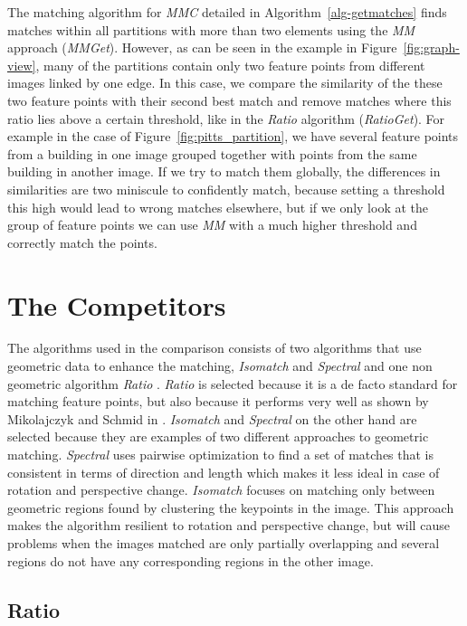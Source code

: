 The matching algorithm for \emph{MMC} detailed in 
Algorithm~\ref{alg-getmatches} finds matches within all partitions with 
more than two elements using the \emph{MM} approach (\emph{MMGet}).  
However, as can be seen in the example in Figure~\ref{fig:graph-view}, 
many of the partitions contain only two feature points from different 
images linked by one edge. In this case, we compare the similarity of 
the these two feature points with their second best match and remove 
matches where this ratio lies above a certain threshold, like in the 
\emph{Ratio} algorithm (\emph{RatioGet}).  For example in the case of 
Figure~\ref{fig:pitts_partition}, we have several feature points from a 
building in one image grouped together with points from the same 
building in another image. If we try to match them globally, the 
differences in similarities are two miniscule to confidently match, 
because setting a threshold this high would lead to wrong matches 
elsewhere, but if we only look at the group of feature points we can use 
\emph{MM} with a much higher threshold and correctly match the points.

\section{The Competitors}

The algorithms used in the comparison consists of two algorithms that 
use geometric data to enhance the matching, \emph{Isomatch} 
\cite{das2008event} and \emph{Spectral} \cite{leordeanu2005spectral} and 
one non geometric algorithm \emph{Ratio} \cite{lowe2004sift}.  
\emph{Ratio} is selected because it is a de facto standard for matching 
feature points, but also because it performs very well as shown by 
Mikolajczyk and Schmid in \cite{mikolajczyk2005performance}.  
\emph{Isomatch} and \emph{Spectral} on the other hand are selected 
because they are examples of two different approaches to geometric 
matching. \emph{Spectral} uses pairwise optimization to find a set of 
matches that is consistent in terms of direction and length which makes 
it less ideal in case of rotation and perspective change. 
\emph{Isomatch} focuses on matching only between geometric regions found 
by clustering the keypoints in the image.  This approach makes the 
algorithm resilient to rotation and perspective change, but will cause 
problems when the images matched are only partially overlapping and 
several regions do not have any corresponding regions in the other 
image.

\subsection{Ratio}
\label{ss:ratio}

